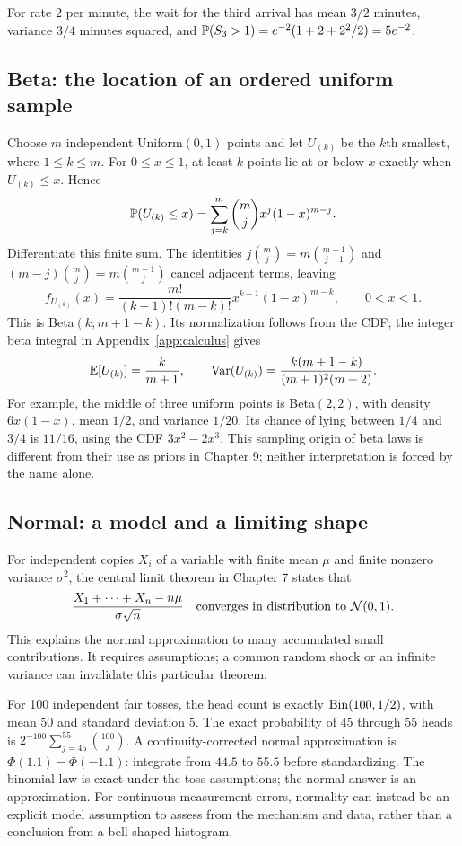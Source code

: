 For rate $2$ per minute, the wait for the third arrival has mean
$3/2$ minutes, variance $3/4$ minutes squared, and
$\P(S_3>1)=e^{-2}(1+2+2^2/2)=5e^{-2}$.

\subsection{Beta: the location of an ordered uniform sample}
\label{sec:beta-order-statistics}

Choose $m$ independent Uniform$(0,1)$ points and let $U_{(k)}$ be the
$k$th smallest, where $1\le k\le m$. For $0\le x\le1$, at least $k$
points lie at or below $x$ exactly when $U_{(k)}\le x$. Hence
\[
\P(U_{(k)}\le x)=\sum_{j=k}^m\binom mjx^j(1-x)^{m-j}.
\]
Differentiate this finite sum. The identities
$j\binom mj=m\binom{m-1}{j-1}$ and
$(m-j)\binom mj=m\binom{m-1}j$ cancel adjacent terms, leaving
\[
\boxed{f_{U_{(k)}}(x)=\frac{m!}{(k-1)!(m-k)!}
x^{k-1}(1-x)^{m-k},\qquad 0<x<1.}
\]
This is Beta$(k,m+1-k)$. Its normalization follows from the CDF;
the integer beta integral in Appendix~\ref{app:calculus} gives
\[
\E[U_{(k)}]=\frac{k}{m+1},\qquad
\Var(U_{(k)})=\frac{k(m+1-k)}{(m+1)^2(m+2)}.
\]
For example, the middle of three uniform points is Beta$(2,2)$, with
density $6x(1-x)$, mean $1/2$, and variance $1/20$. Its chance of
lying between $1/4$ and $3/4$ is $11/16$, using the CDF $3x^2-2x^3$.
This sampling origin of beta laws is different from their use as priors
in Chapter 9; neither interpretation is forced by the name alone.

\subsection{Normal: a model and a limiting shape}

For independent copies $X_i$ of a variable with finite mean $\mu$ and
finite nonzero variance $\sigma^2$, the central limit theorem in
Chapter 7 states that
\[
\frac{X_1+\cdots+X_n-n\mu}{\sigma\sqrt n}
\quad\text{converges in distribution to }\Normal(0,1).
\]
This explains the normal approximation to many accumulated small
contributions. It requires assumptions; a common random shock or an
infinite variance can invalidate this particular theorem.

For 100 independent fair tosses, the head count is exactly
$\Bin(100,1/2)$, with mean $50$ and standard deviation $5$.
The exact probability of 45 through 55 heads is
$2^{-100}\sum_{j=45}^{55}\binom{100}j$.
A continuity-corrected normal approximation is
$\Phi(1.1)-\Phi(-1.1)$: integrate from $44.5$ to $55.5$ before
standardizing. The binomial law is exact under the toss assumptions;
the normal answer is an approximation. For continuous measurement errors,
normality can instead be an explicit model assumption to assess from the
mechanism and data, rather than a conclusion from a bell-shaped histogram.
